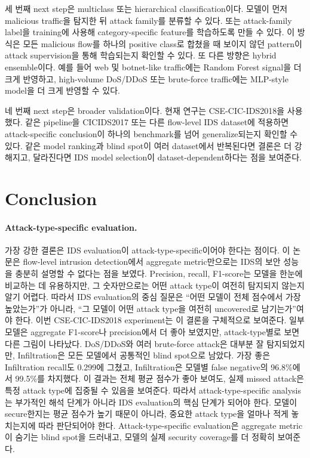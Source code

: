 \documentclass[sigconf,nonacm]{acmart}
\begin{document}
세 번째 next step은 multiclass 또는 hierarchical classification이다.
모델이 먼저 malicious traffic을 탐지한 뒤 attack family를 분류할 수 있다.
또는 attack-family label을 training에 사용해 category-specific feature를 학습하도록 만들 수 있다.
이 방식은 모든 malicious flow를 하나의 positive class로 합쳤을 때 보이지 않던 pattern이 attack supervision을 통해 학습되는지 확인할 수 있다.
또 다른 방향은 hybrid ensemble이다.
예를 들어 web 및 botnet-like traffic에는 Random Forest signal을 더 크게 반영하고, high-volume DoS/DDoS 또는 brute-force traffic에는 MLP-style model을 더 크게 반영할 수 있다.

네 번째 next step은 broader validation이다.
현재 연구는 CSE-CIC-IDS2018을 사용했다.
같은 pipeline을 CICIDS2017 또는 다른 flow-level IDS dataset에 적용하면 attack-specific conclusion이 하나의 benchmark를 넘어 generalize되는지 확인할 수 있다.
같은 model ranking과 blind spot이 여러 dataset에서 반복된다면 결론은 더 강해지고, 달라진다면 IDS model selection이 dataset-dependent하다는 점을 보여준다.

\section{Conclusion}

\paragraph{Attack-type-specific evaluation.}
가장 강한 결론은 IDS evaluation이 attack-type-specific이어야 한다는 점이다.
이 논문은 flow-level intrusion detection에서 aggregate metric만으로는 IDS의 보안 성능을 충분히 설명할 수 없다는 점을 보였다.
Precision, recall, F1-score는 모델을 한눈에 비교하는 데 유용하지만, 그 숫자만으로는 어떤 attack type이 여전히 탐지되지 않는지 알기 어렵다.
따라서 IDS evaluation의 중심 질문은 “어떤 모델이 전체 점수에서 가장 높았는가”가 아니라, “그 모델이 어떤 attack type을 여전히 uncovered로 남기는가”여야 한다. 이번 CSE-CIC-IDS2018 experiment는 이 결론을 구체적으로 보여준다.
일부 모델은 aggregate F1-score나 precision에서 더 좋아 보였지만, attack-type별로 보면 다른 그림이 나타났다.
DoS/DDoS와 여러 brute-force attack은 대부분 잘 탐지되었지만, Infiltration은 모든 모델에서 공통적인 blind spot으로 남았다.
가장 좋은 Infiltration recall도 0.299에 그쳤고, Infiltration은 모델별 false negative의 96.8\%에서 99.5\%를 차지했다.
이 결과는 전체 평균 점수가 좋아 보여도, 실제 missed attack은 특정 attack type에 집중될 수 있음을 보여준다. 따라서 attack-type-specific analysis는 부가적인 해석 단계가 아니라 IDS evaluation의 핵심 단계가 되어야 한다.
모델이 secure한지는 평균 점수가 높기 때문이 아니라, 중요한 attack type을 얼마나 적게 놓치는지에 따라 판단되어야 한다.
Attack-type-specific evaluation은 aggregate metric이 숨기는 blind spot을 드러내고, 모델의 실제 security coverage를 더 정확히 보여준다.
\end{document}
